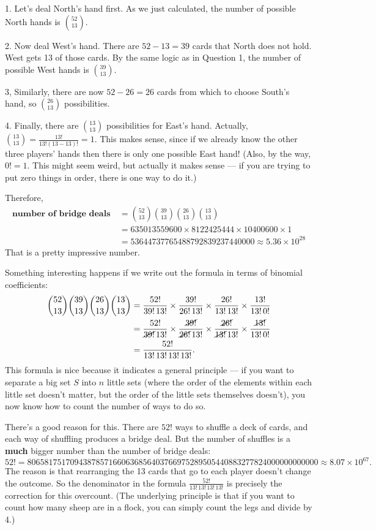 \documentclass{amsart}
\numberwithin{equation}{section}
\newcommand{\x}{\times}
\begin{document}
1. Let's deal North's hand first.  As we just calculated, the number of possible North hands is $\binom{52}{13}$.

2. Now deal West's hand.  There are $52-13=39$ cards that North does not hold.  West gets 13 of those cards.  By the same logic as in Question 1, the number of possible West hands is $\binom{39}{13}$.

3, Similarly, there are now $52-26=26$ cards from which to choose South's hand, so $\binom{26}{13}$ possibilities.

4. Finally, there are $\binom{13}{13}$ possibilities for East's hand.  Actually, $\binom{13}{13}=\frac{13!}{13!(13-13)!}=1$.  This makes sense, since if we already know the other three players' hands then there is only one possible East hand!  (Also, by the way, $0!=1$.  This might seem weird, but actually it makes sense --- if you are trying to put zero things in order, there is one way to do it.)

Therefore,
\boldmath\begin{align*}
\textbf{number of bridge deals} ~&= \binom{52}{13}\binom{39}{13}\binom{26}{13}\binom{13}{13}\\
&= 635013559600\x 8122425444\x 10400600\x 1\\
&= 53644737765488792839237440000 \approx 5.36\x10^{28}
 \end{align*}\unboldmath
 That is a pretty impressive number.
 
 Something interesting happens if we write out the formula in terms of binomial coefficients:
\begin{align*}
\binom{52}{13}\binom{39}{13}\binom{26}{13}\binom{13}{13}
&= \frac{52!}{39!\,13!}\x\frac{39!}{26!\,13!}\x\frac{26!}{13!\,13!}\x\frac{13!}{13!\,0!}\\
&= \frac{52!}{\cancel{39!}\,13!}\x\frac{\cancel{39!}}{\cancel{26!}\,13!}\x\frac{\cancel{26!}}{\cancel{13!}\,13!}\x\frac{\cancel{13!}}{13!\,0!}\\
&= \frac{52!}{13!\,13!\,13!\,13!}.
\end{align*}
This formula is nice because it indicates a general principle --- if you want to separate a big set $S$ into $n$ little sets (where the order of the elements within each little set doesn't matter, but the order of the little sets themselves doesn't), you now know how to count the number of ways to do so.

There's a good reason for this.  There are $52!$ ways to shuffle a deck of cards, and each way of shuffling produces a bridge deal.  But the number of shuffles is a \textbf{much} bigger number than the number of bridge deals:
\[52! = 80658175170943878571660636856403766975289505440883277824000000000000 \approx 8.07\x10^{67}.\]
The reason is that rearranging the 13 cards that go to each player doesn't change the outcome.  So the denominator in the formula $\frac{52!}{13!\,13!\,13!\,13!}$ is precisely the correction for this overcount.  (The underlying principle is that if you want to count how many sheep are in a flock, you can simply count the legs and divide by 4.)
\end{document}
